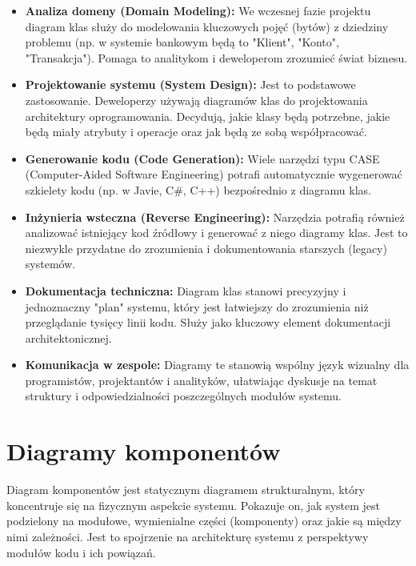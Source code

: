 \documentclass[a4paper,12pt]{article}
\begin{document}
\begin{itemize}
    \item \textbf{Analiza domeny (Domain Modeling):} We wczesnej fazie projektu diagram klas służy do modelowania kluczowych pojęć (bytów) z dziedziny problemu (np. w systemie bankowym będą to "Klient", "Konto", "Transakcja"). Pomaga to analitykom i deweloperom zrozumieć świat biznesu.
    
    \item \textbf{Projektowanie systemu (System Design):} Jest to podstawowe zastosowanie. Deweloperzy używają diagramów klas do projektowania architektury oprogramowania. Decydują, jakie klasy będą potrzebne, jakie będą miały atrybuty i operacje oraz jak będą ze sobą współpracować.
    
    \item \textbf{Generowanie kodu (Code Generation):} Wiele narzędzi typu CASE (Computer-Aided Software Engineering) potrafi automatycznie wygenerować szkielety kodu (np. w Javie, C\#, C++) bezpośrednio z diagramu klas.
    
    \item \textbf{Inżynieria wsteczna (Reverse Engineering):} Narzędzia potrafią również analizować istniejący kod źródłowy i generować z niego diagramy klas. Jest to niezwykle przydatne do zrozumienia i dokumentowania starszych (legacy) systemów.
    
    \item \textbf{Dokumentacja techniczna:} Diagram klas stanowi precyzyjny i jednoznaczny "plan" systemu, który jest łatwiejszy do zrozumienia niż przeglądanie tysięcy linii kodu. Służy jako kluczowy element dokumentacji architektonicznej.
    
    \item \textbf{Komunikacja w zespole:} Diagramy te stanowią wspólny język wizualny dla programistów, projektantów i analityków, ułatwiając dyskusje na temat struktury i odpowiedzialności poszczególnych modułów systemu.
\end{itemize}

\section{Diagramy komponentów}

Diagram komponentów jest statycznym diagramem strukturalnym, który koncentruje się na fizycznym aspekcie systemu. Pokazuje on, jak system jest podzielony na modułowe, wymienialne części (komponenty) oraz jakie są między nimi zależności. Jest to spojrzenie na architekturę systemu z perspektywy modułów kodu i ich powiązań.
\end{document}
